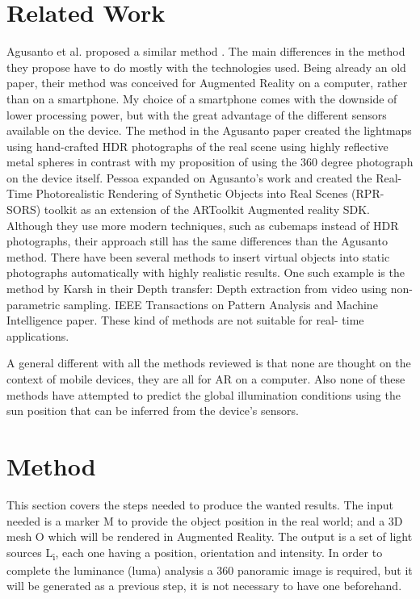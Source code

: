 \documentclass{article}
\begin{document}
\section{Related Work}
Agusanto et al. proposed a similar method \cite{agusanto2003}. The main differences in the method they propose have to do mostly with the technologies used. Being already an old paper, their method was conceived for Augmented Reality on a computer, rather than on a smartphone. My choice of a smartphone comes with the downside of lower processing power, but with the great advantage of the different sensors available on the device. The method in the Agusanto paper created the lightmaps using hand-crafted HDR photographs of the real scene using highly reflective metal spheres in contrast with my proposition of using the 360 degree photograph on the device itself.
Pessoa\cite{pessoa2011} expanded on Agusanto's work and created the Real-Time Photorealistic Rendering of Synthetic Objects into Real Scenes (RPR-SORS) toolkit as an extension of the ARToolkit Augmented reality SDK. Although they use more modern techniques, such as cubemaps instead of HDR photographs, their approach still has the same differences than the Agusanto method.
There have been several methods to insert virtual objects into static photographs automatically with highly realistic results. One such example is the method by Karsh \cite{karsh2014} in their Depth transfer: Depth extraction from video using non-parametric sampling. IEEE Transactions on Pattern Analysis and Machine Intelligence paper. These kind of methods are not suitable for real- time applications.

A general different with all the methods reviewed is that none are thought on the context of mobile devices, they are all for AR on a computer. Also none of these methods have attempted to predict the global illumination conditions using the sun position that can be inferred from the device's sensors.

\section{Method}
This section covers the steps needed to produce the wanted results. The input needed is a marker M to provide the object position in the real world; and a 3D mesh O which will be rendered in Augmented Reality. The output is a set of light sources L\textsubscript{i}, each one having a position, orientation and intensity. In order to complete the luminance (luma) analysis a 360 panoramic image is required, but it will be generated as a previous step, it is not necessary to have one beforehand.
\end{document}

